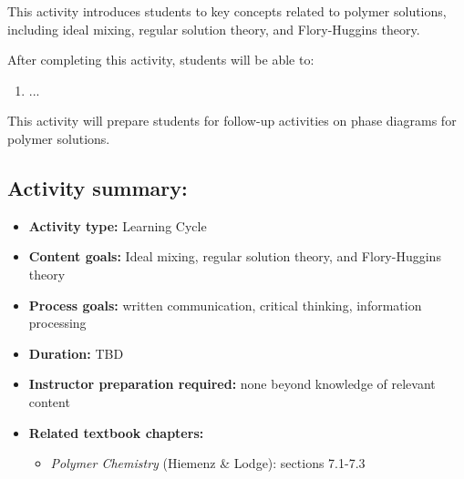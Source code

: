 %
%
%
%

\renewcommand{\figpath}{content/polymphys/solutino-thermo/flory-huggins/figs}

\begin{activity}

\begin{instructornotes}

	This activity introduces students to key concepts related to polymer solutions, including ideal mixing, regular solution theory, and Flory-Huggins theory.
	
	After completing this activity, students will be able to:
			\begin{enumerate}
				\item ...
			\end{enumerate}
	This activity will prepare students for follow-up activities on phase diagrams for polymer solutions.
			
	\subsection*{Activity summary:}
	\begin{itemize}
		\item \textbf{Activity type:} Learning Cycle
		\item \textbf{Content goals:} Ideal mixing, regular solution theory, and Flory-Huggins theory
		\item \textbf{Process goals:} %
			written communication, critical thinking, information processing
		\item \textbf{Duration:} TBD
		\item \textbf{Instructor preparation required:} none beyond knowledge of relevant content
		\item \textbf{Related textbook chapters:}
			\begin{itemize}
				\item \emph{Polymer Chemistry} (Hiemenz \& Lodge): sections 7.1-7.3
		\end{itemize}
	\end{itemize}


\end{instructornotes}
\end{activity}
